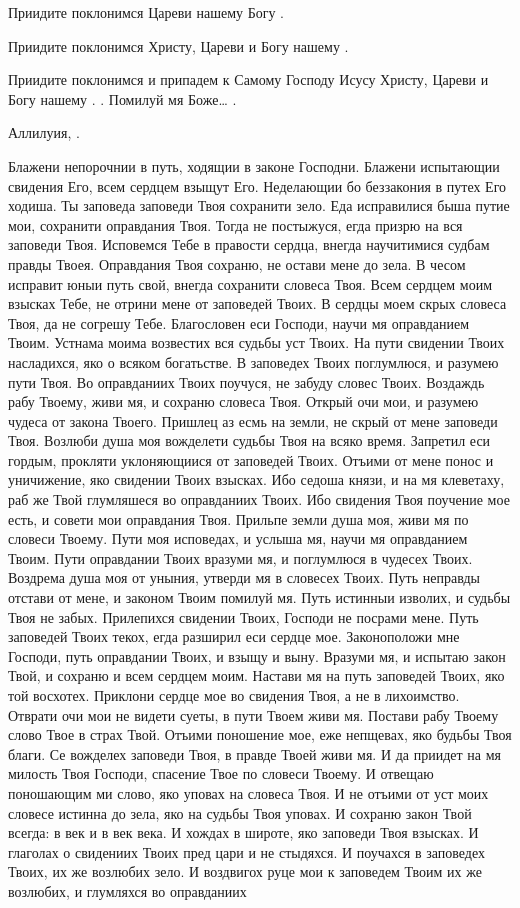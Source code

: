 \begin{mymulticols}
Приидите поклонимся Цареви нашему Богу .

Приидите поклонимся Христу, Цареви и Богу нашему .

Приидите поклонимся и припадем к Самому Господу Исусу Христу, Цареви и Богу нашему . . Помилуй мя Боже… .


Аллилуия, .


Блажени непорочнии в путь, ходящии в законе Господни. Блажени испытающии свидения Его, всем сердцем взыщут Его. Неделающии бо беззакония в путех Его ходиша. Ты заповеда заповеди Твоя сохранити зело. Еда исправилися быша путие мои, сохранити оправдания Твоя. Тогда не постыжуся, егда призрю на вся заповеди Твоя. Исповемся Тебе в правости сердца, внегда научитимися судбам правды Твоея. Оправдания Твоя сохраню, не остави мене до зела. В чесом исправит юныи путь свой, внегда сохранити словеса Твоя. Всем сердцем моим взысках Тебе, не отрини мене от заповедей Твоих. В сердцы моем скрых словеса Твоя, да не согрешу Тебе. Благословен еси Господи, научи мя оправданием Твоим. Устнама моима возвестих вся судьбы уст Твоих. На пути свидении Твоих насладихся, яко о всяком богатьстве. В заповедех Твоих поглумлюся, и разумею пути Твоя. Во оправданиих Твоих поучуся, не забуду словес Твоих. Воздаждь рабу Твоему, живи мя, и сохраню словеса Твоя. Открый очи мои, и разумею чудеса от закона Твоего. Пришлец аз есмь на земли, не скрый от мене заповеди Твоя. Возлюби душа моя вожделети судьбы Твоя на всяко время. Запретил еси гордым, прокляти уклоняющиися от заповедей Твоих. Отъими от мене понос и уничижение, яко свидении Твоих взысках. Ибо седоша князи, и на мя клеветаху, раб же Твой глумляшеся во оправданиих Твоих. Ибо свидения Твоя поучение мое есть, и совети мои оправдания Твоя. Прильпе земли душа моя, живи мя по словеси Твоему. Пути моя исповедах, и услыша мя, научи мя оправданием Твоим. Пути оправдании Твоих вразуми мя, и поглумлюся в чудесех Твоих. Воздрема душа моя от уныния, утверди мя в словесех Твоих. Путь неправды отстави от мене, и законом Твоим помилуй мя. Путь истинныи изволих, и судьбы Твоя не забых. Прилепихся свидении Твоих, Господи не посрами мене. Путь заповедей Твоих текох, егда разширил еси сердце мое. Законоположи мне Господи, путь оправдании Твоих, и взыщу и выну. Вразуми мя, и испытаю закон Твой, и сохраню и всем сердцем моим. Настави мя на путь заповедей Твоих, яко той восхотех. Приклони сердце мое во свидения Твоя, а не в лихоимство. Отврати очи мои не видети суеты, в пути Твоем живи мя. Постави рабу Твоему слово Твое в страх Твой. Отъими поношение мое, еже непщевах, яко будьбы Твоя благи. Се вожделех заповеди Твоя, в правде Твоей живи мя. И да приидет на мя милость Твоя Господи, спасение Твое по словеси Твоему. И отвещаю поношающим ми слово, яко уповах на словеса Твоя. И не отъими от уст моих словесе истинна до зела, яко на судьбы Твоя уповах. И сохраню закон Твой всегда: в век и в век века. И хождах в широте, яко заповеди Твоя взысках. И глаголах о свидениих Твоих пред цари и не стыдяхся. И поучахся в заповедех Твоих, их же возлюбих зело. И воздвигох руце мои к заповедем Твоим их же возлюбих, и глумляхся во оправданиих 
\end{mymulticols}
